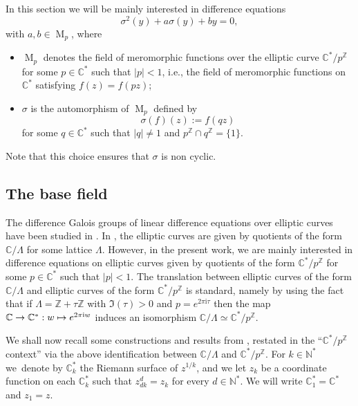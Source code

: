 \documentclass[11pt]{article}
\newcommand{\ie}{i.e.,\xspace}
\numberwithin{equation}{section}\providecommand{\loccit}{\textit{loc.\ cit.}}
\newcommand\mto{\mathchoice{\longmapsto}{\mapsto}{\mapsto}{\mapsto}}
\theoremstyle{definition}
\newcommand{\N}{\mathbb N}
\newcommand{\Z}{\mathbb Z}
\newcommand{\C}{\mathbb C}
\let\s\sigma
\newcommand{\mero}{\operatorname{M}}
\begin{document}
In this section we will be mainly interested in difference equations
\begin{equation}\label{eq:2hypergeo}
\s^{2}(y)+a\s (y)+by=0,
\end{equation}
with $a,b\in \mero_{p}$, where
\begin{itemize}
\item $\mero_{p}$ denotes the field of meromorphic functions over the elliptic curve $\C^{*}/p^{\Z}$ for some $p\in \C^{*}$ such that $\vert p \vert < 1$, \ie the field of meromorphic functions on $\C^{*}$ satisfying $f(z)=f(pz)$;
\item $\s$ is the automorphism of $\mero_{p}$ defined by
\[
\s (f)(z):=f(qz)
\]
for some $q\in \C^{*}$ such that $\vert q \vert \neq 1$ and $p^{\Z} \cap q^{\Z}=\{1\}$.
\end{itemize}
Note that this choice ensures that $\sigma$ is non cyclic.

\subsection{The base field}\label{sec31}

The difference Galois groups of linear difference equations over elliptic curves have been studied in \cite{dreyfus2015galois}. In \loccit, the elliptic curves are given by quotients of the form $\C/\Lambda$ for some lattice $\Lambda$.
However, in the present work, we are mainly interested in difference equations on elliptic curves given by quotients of the form $\C^{*}/p^{\Z}$ for some $p\in \C^{*}$ such that $\vert p \vert < 1$. The translation between elliptic curves of the form $\C/\Lambda$ and elliptic curves of the form $\C^{*}/p^{\Z}$ is standard, namely by using the fact that if $\Lambda=\Z+\tau \Z$ with $\Im(\tau)>0$ and $p = e^{2 \pi \mathrm{i} \tau}$ then the map $\C\to\C^{*}:w\mto e^{2\pi\mathrm{i}w}$ induces an isomorphism $\C/\Lambda\simeq \C^{*}/p^\Z$.

We shall now recall some constructions and results from \cite{dreyfus2015galois}, restated in the ``$\C^{*}/p ^{\Z}$ context'' via the above identification between $\C/\Lambda$ and $\C^{*}/p ^{\Z}$. For $k\in\N^{*}$ we~denote by $\C^{*}_k$ the Riemann surface of $z^{1/k}$, and we let $z_k$ be a coordinate function on each $\C^{*}_k$ such that $z_{dk}^d=z_k$ for every $d\in\N^{*}$. We will write $\C^{*}_1=\C^{*}$ and $z_1=z$.
\end{document}
